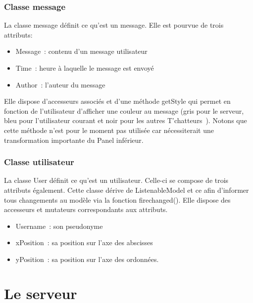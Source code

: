\documentclass[a4paper,12pt]{report}
\begin{document}
      \subsection{Classe message}
        La classe message définit ce qu’est un message. Elle est pourvue de trois attributs:
        \begin{itemize}
          \item Message : contenu d’un message utilisateur
          \item Time : heure à laquelle le message est envoyé
          \item Author : l’auteur du message
        \end{itemize}
        \bigbreak
        Elle dispose d’accesseurs associés et d’une méthode getStyle qui permet en fonction de l’utilisateur d’afficher une couleur au message (gris pour le serveur, bleu pour l’utilisateur courant et noir pour les autres T’chatteurs ). Notons que cette méthode n'est pour le moment pas utilisée car nécessiterait une transformation importante du Panel inférieur.

      \subsection{Classe utilisateur}
        La classe User définit ce qu’est un utilisateur. Celle-ci se compose de trois attributs également. Cette classe dérive de ListenableModel et ce afin d’informer tous changements au modèle via la fonction firechanged(). Elle dispose des accesseurs et mutateurs correspondants aux attributs.
        \begin{itemize}
          \item Username : son pseudonyme
          \item xPosition : sa position sur l’axe des abscisses
          \item yPosition : sa position sur l’axe des ordonnées.
        \end{itemize}

  \chapter{Le serveur}
\end{document}
